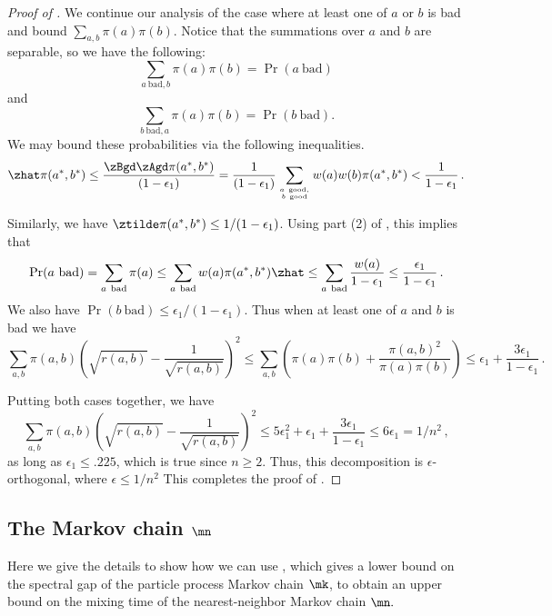 \begin{proof}[Proof of ]
We continue our analysis of the case where at least one of $a$ or $b$ is bad and bound $\sum_{a,b}\pi(a)\pi(b).$ 
Notice that the summations over $a$ and $b$ are separable, so we have 
the following:
\begin{equation*}
  \sum_{a~\text{bad}, b} \pi(a)\pi(b) = \Pr(a~\text{bad})
\end{equation*}
and
\begin{equation*}
  \sum_{b~\text{bad}, a} \pi(a)\pi(b) = \Pr(b~\text{bad}).
\end{equation*}
We may bound these probabilities via the following inequalities.
 $$\zhat\pi(a^*,b^*) \leq
  \frac{\zBgd\zAgd\pi(a^*,b^*)}{(1-\epsilon_1)}=\frac{1}{(1-\epsilon_1)}\sum_{a~\text{good},\atop
    b~\text{good}} w(a)w(b) \pi(a^*,b^*)  <
  \frac{1}{1-\epsilon_1}\,.$$
  
\noindent Similarly, we have $\ztilde\pi(a^*,b^*)\leq 
1/(1-\epsilon_1)$.  Using part (2) of , this 
implies that
  \[\Pr(a~\text{bad}) = \sum_{a~\text{bad}}\pi(a) \leq
  \sum_{a~\text{bad}}w(a)\pi(a^*,b^*)\zhat\leq
  \sum_{a~\text{bad}}\frac{w(a)}{1-\epsilon_1}\leq
  \frac{\epsilon_1}{1-\epsilon_1} \,.\]
  We also have $\Pr(b~\text{bad}) \leq \epsilon_1/(1-\epsilon_1)$.
Thus when at least one of $a$ and $b$ is bad we have $$\sum_{a,b}\pi(a,b)\left(\sqrt{r(a,b)}-\frac{1}{\sqrt{r(a,b)}}\right)^2\leq
\sum_{a,b} \left(\pi(a)\pi(b) + \frac{\pi(a,b)^2}{\pi(a)\pi(b)}\right) \leq \epsilon_1 + \frac{3\epsilon_1}{1-\epsilon_1}\,.$$

Putting both cases together, we have
 \[\sum_{a, b}\pi(a,b)\left(\sqrt{r(a,b)}-\frac{1}{\sqrt{r(a,b)}}\right)^2\leq
  5\epsilon_1^2 + \epsilon_1 + \frac{3\epsilon_1}{1-\epsilon_1} \leq
  6\epsilon_1 = 1/n^2\,,\]
  as long as $\epsilon_1\leq .225$, which is true since $n\geq 2$.
Thus, this decomposition is %
$\epsilon$-orthogonal, where $\epsilon\leq 1/n^2$ %
This completes the proof of . %
%
%
%
\end{proof}   %

\subsection{The Markov chain $\mn$}\label{sec:mn}

Here we give the details to show how we can use , 
which gives a  %
lower  %
bound on the spectral gap of the particle process Markov 
chain $\mk$, to obtain %
an upper  %
bound on the mixing time of the 
nearest-neighbor Markov chain $\mn.$  


